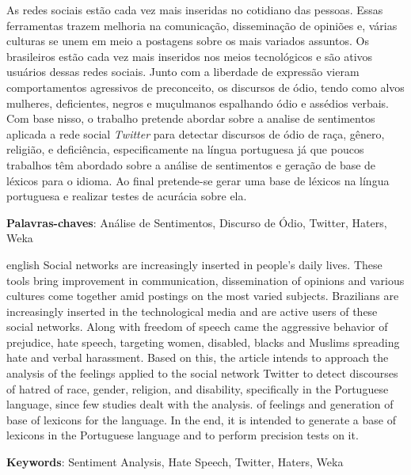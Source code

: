 \setlength{\absparsep}{18pt} %
\begin{resumo}

As redes sociais estão cada vez mais inseridas no cotidiano das pessoas. Essas ferramentas trazem melhoria na comunicação, disseminação de opiniões e, várias culturas se unem em meio a postagens sobre os mais variados assuntos. Os brasileiros estão cada vez mais inseridos nos meios tecnológicos e são ativos usuários dessas redes sociais. Junto com a liberdade de expressão vieram comportamentos agressivos de preconceito, os discursos de ódio, tendo como alvos mulheres, deficientes, negros e muçulmanos espalhando ódio e assédios verbais. Com base nisso, o trabalho pretende abordar sobre a analise de sentimentos aplicada a rede social \textit{Twitter} para detectar discursos de ódio de raça, gênero, religião, e deficiência, especificamente na língua portuguesa já que poucos trabalhos têm abordado sobre a análise de sentimentos e geração de base de léxicos para o idioma. Ao final pretende-se gerar uma base de léxicos na língua portuguesa e realizar testes de acurácia sobre ela.


 \textbf{Palavras-chaves}: Análise de Sentimentos, Discurso de Ódio, Twitter, Haters, Weka
\end{resumo}

\begin{resumo}[Abstract]
 \begin{otherlanguage*}{english}
   Social networks are increasingly inserted in people's daily lives. These tools bring improvement in communication, dissemination of opinions and various cultures come together amid postings on the most varied subjects. Brazilians are increasingly inserted in the technological media and are active users of these social networks. Along with freedom of speech came the aggressive behavior of prejudice, hate speech, targeting women, disabled, blacks and Muslims spreading hate and verbal harassment. Based on this, the article intends to approach the analysis of the feelings applied to the social network Twitter to detect discourses of hatred of race, gender, religion, and disability, specifically in the Portuguese language, since few studies dealt with the analysis. of feelings and generation of base of lexicons for the language. In the end, it is intended to generate a base of lexicons in the Portuguese language and to perform precision tests on it.

   \vspace{\onelineskip}
 
   \noindent 
   \textbf{Keywords}: Sentiment Analysis, Hate Speech, Twitter, Haters, Weka
 \end{otherlanguage*}
\end{resumo}
